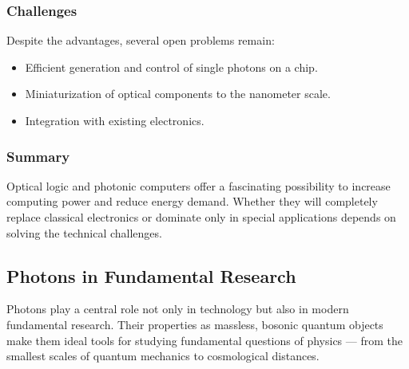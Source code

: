 \subsubsection{Challenges}

Despite the advantages, several open problems remain:
\begin{itemize}
	\item Efficient generation and control of single photons on a chip.
	\item Miniaturization of optical components to the nanometer scale.
	\item Integration with existing electronics.
\end{itemize}

\subsubsection{Summary}

Optical logic and photonic computers offer a fascinating possibility to increase computing power and reduce energy demand. Whether they will completely replace classical electronics or dominate only in special applications depends on solving the technical challenges.

\newpage
\noindent
\subsection{Photons in Fundamental Research}

Photons play a central role not only in technology but also in modern fundamental research. 
Their properties as massless, bosonic quantum objects make them ideal tools for studying fundamental questions of physics — from the smallest scales of quantum mechanics to cosmological distances.

